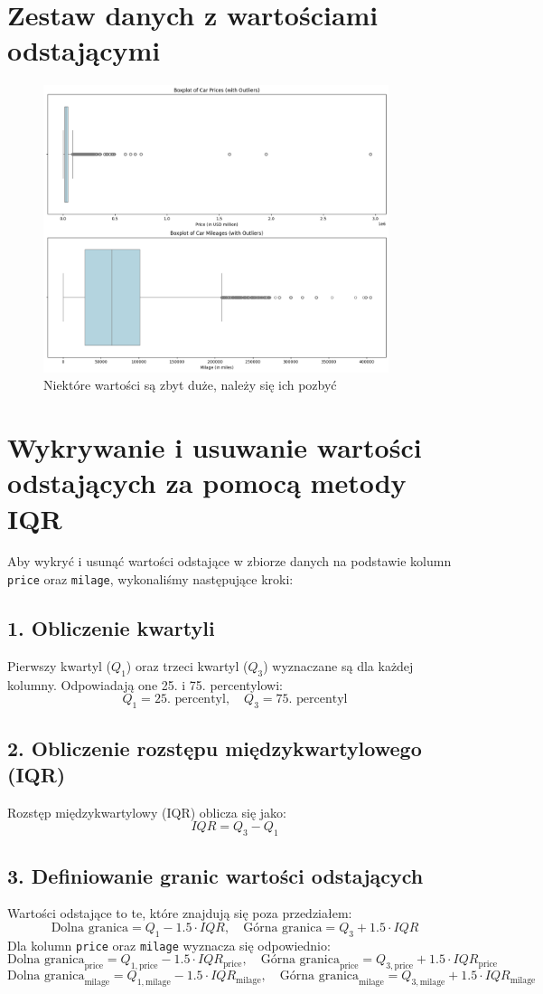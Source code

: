 \documentclass[12pt, a4paper]{report}
\begin{document}
\section{Zestaw danych z wartościami odstającymi}
\begin{figure}[H]
    \centering
    \includegraphics[width=0.9\textwidth]{images/boxplots_with_outlires.png}
    \caption{Niektóre wartości są zbyt duże, należy się ich pozbyć}
\end{figure}
\section{Wykrywanie i usuwanie wartości odstających za pomocą metody IQR}

Aby wykryć i usunąć wartości odstające w zbiorze danych na podstawie kolumn \texttt{price} oraz \texttt{milage}, wykonaliśmy następujące kroki:

\subsection*{1. Obliczenie kwartyli}
Pierwszy kwartyl ($Q_1$) oraz trzeci kwartyl ($Q_3$) wyznaczane są dla każdej kolumny. Odpowiadają one 25. i 75. percentylowi:
\[
Q_1 = \text{25. percentyl}, \quad Q_3 = \text{75. percentyl}
\]
\subsection*{2. Obliczenie rozstępu międzykwartylowego (IQR)}
Rozstęp międzykwartylowy (IQR) oblicza się jako:
\[
IQR = Q_3 - Q_1
\]
\subsection*{3. Definiowanie granic wartości odstających}
Wartości odstające to te, które znajdują się poza przedziałem:
\[
\text{Dolna granica} = Q_1 - 1.5 \cdot IQR, \quad \text{Górna granica} = Q_3 + 1.5 \cdot IQR
\]
Dla kolumn \texttt{price} oraz \texttt{milage} wyznacza się odpowiednio:
\[
\text{Dolna granica}_{\text{price}} = Q_{1,\text{price}} - 1.5 \cdot IQR_{\text{price}}, \quad \text{Górna granica}_{\text{price}} = Q_{3,\text{price}} + 1.5 \cdot IQR_{\text{price}}
\]
\[
\text{Dolna granica}_{\text{milage}} = Q_{1,\text{milage}} - 1.5 \cdot IQR_{\text{milage}}, \quad \text{Górna granica}_{\text{milage}} = Q_{3,\text{milage}} + 1.5 \cdot IQR_{\text{milage}}
\]
\end{document}
